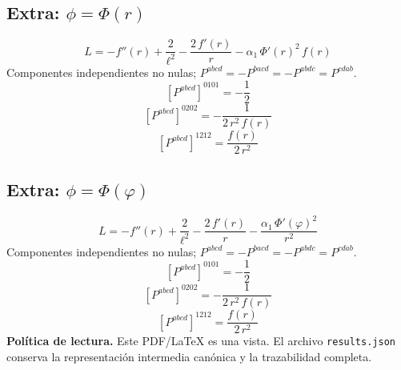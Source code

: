 \documentclass[11pt]{article}
\begin{document}
\subsection*{Extra: $\phi=\Phi\!\left(r\right)$}
\begin{dmath*}[breakdepth={5}]
L=-f''\!\left(r\right) + \frac{2}{{\ell}^{2}} - \frac{2\,f'\!\left(r\right)}{r} - \alpha_{1}\,{\Phi'\!\left(r\right)}^{2}\,f\!\left(r\right)
\end{dmath*}
Componentes independientes no nulas; $P^{abcd}=-P^{bacd}=-P^{abdc}=P^{cdab}$.
\begin{dmath*}[breakdepth={5}]
\left[P^{abcd}\right]^{0101}=-\frac{1}{2}
\end{dmath*}
\begin{dmath*}[breakdepth={5}]
\left[P^{abcd}\right]^{0202}=-\frac{1}{2\,{r}^{2}\,f\!\left(r\right)}
\end{dmath*}
\begin{dmath*}[breakdepth={5}]
\left[P^{abcd}\right]^{1212}=\frac{f\!\left(r\right)}{2\,{r}^{2}}
\end{dmath*}
\subsection*{Extra: $\phi=\Phi\!\left(\varphi\right)$}
\begin{dmath*}[breakdepth={5}]
L=-f''\!\left(r\right) + \frac{2}{{\ell}^{2}} - \frac{2\,f'\!\left(r\right)}{r} - \frac{\alpha_{1}\,{\Phi'\!\left(\varphi\right)}^{2}}{{r}^{2}}
\end{dmath*}
Componentes independientes no nulas; $P^{abcd}=-P^{bacd}=-P^{abdc}=P^{cdab}$.
\begin{dmath*}[breakdepth={5}]
\left[P^{abcd}\right]^{0101}=-\frac{1}{2}
\end{dmath*}
\begin{dmath*}[breakdepth={5}]
\left[P^{abcd}\right]^{0202}=-\frac{1}{2\,{r}^{2}\,f\!\left(r\right)}
\end{dmath*}
\begin{dmath*}[breakdepth={5}]
\left[P^{abcd}\right]^{1212}=\frac{f\!\left(r\right)}{2\,{r}^{2}}
\end{dmath*}
\bigskip\noindent\textbf{Política de lectura.} Este PDF/LaTeX es una vista. El archivo \texttt{results.json} conserva la representación intermedia canónica y la trazabilidad completa.
\end{document}
